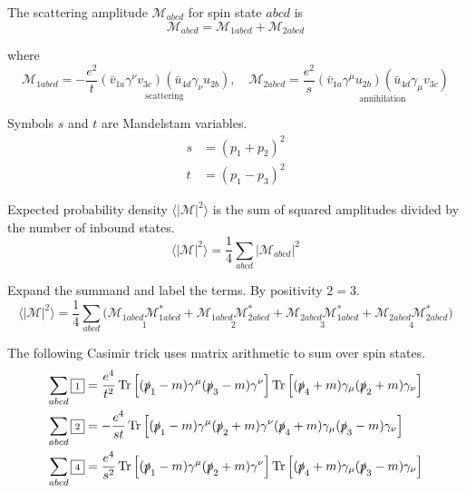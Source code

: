 The scattering amplitude $\mathcal M_{abcd}$ for spin state $abcd$ is
\begin{equation*}
\mathcal M_{abcd}=\mathcal M_{1abcd}+\mathcal M_{2abcd}
\end{equation*}

where
\begin{equation*}
\mathcal M_{1abcd}=-\frac{e^2}{t}
\underset{\text{scattering}}
{(\bar v_{1a}\gamma^\nu v_{3c})(\bar u_{4d}\gamma_\nu u_{2b})},
\quad
\mathcal M_{2abcd}=\frac{e^2}{s}
\underset{\text{annihilation}}
{(\bar v_{1a}\gamma^\mu u_{2b})(\bar u_{4d}\gamma_\mu v_{3c})}
\end{equation*}

Symbols $s$ and $t$ are Mandelstam variables.
\begin{align*}
s&=(p_1+p_2)^2
\\
t&=(p_1-p_3)^2
\end{align*}

Expected probability density $\langle|\mathcal M|^2\rangle$
is the sum of squared amplitudes divided by the number of inbound states.
\begin{equation*}
\langle|\mathcal M|^2\rangle=\frac{1}{4}\sum_{abcd}|\mathcal M_{abcd}|^2
\end{equation*}

Expand the summand and label the terms.
By positivity $\boxed{\scriptstyle2}=\boxed{\scriptstyle3}$.
\begin{equation*}
\langle|\mathcal{M}|^2\rangle=\frac{1}{4}
\sum_{abcd}
\bigl(
\underset{\boxed{\scriptstyle1}}{\mathcal M_{1abcd}\mathcal M_{1abcd}^*}+
\underset{\boxed{\scriptstyle2}}{\mathcal M_{1abcd}\mathcal M_{2abcd}^*}+
\underset{\boxed{\scriptstyle3}}{\mathcal M_{2abcd}\mathcal M_{1abcd}^*}+
\underset{\boxed{\scriptstyle4}}{\mathcal M_{2abcd}\mathcal M_{2abcd}^*}
\bigr)
\end{equation*}

The following Casimir trick uses matrix arithmetic to sum over spin states.
\begin{align*}
\sum_{abcd}{\boxed{\scriptstyle1}}
&=\frac{e^4}{t^2}\operatorname{Tr}\left[
(\slashed p_1-m)\gamma^\mu(\slashed p_3-m)\gamma^\nu
\right]
\operatorname{Tr}\left[
(\slashed p_4+m)\gamma_\mu(\slashed p_2+m)\gamma_\nu
\right]
\\
\sum_{abcd}{\boxed{\scriptstyle2}}
&=-\frac{e^4}{st}\operatorname{Tr}\left[
(\slashed p_1-m)\gamma^\mu(\slashed p_2+m)\gamma^\nu
(\slashed p_4+m)\gamma_\mu(\slashed p_3-m)\gamma_\nu
\right]
\\
\sum_{abcd}{\boxed{\scriptstyle4}}
&=\frac{e^4}{s^2}\operatorname{Tr}\left[
(\slashed p_1-m)\gamma^\mu(\slashed p_2+m)\gamma^\nu
\right]
\operatorname{Tr}\left[
(\slashed p_4+m)\gamma_\mu(\slashed p_3-m)\gamma_\nu
\right]
\end{align*}

